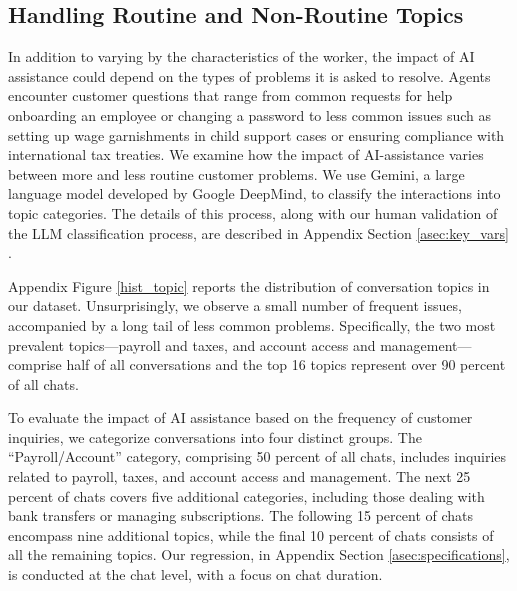 \documentclass[11pt]{article}
\begin{document}
\subsection{Handling Routine and Non-Routine Topics}

In addition to varying by the characteristics of the worker, the impact of AI assistance could depend on the types of problems it is asked to resolve.  Agents encounter customer questions that range from common requests for help onboarding an employee or changing a password to less common issues such as setting up wage garnishments in child support cases or ensuring compliance with international tax treaties. We examine how the impact of AI-assistance varies between more and less routine customer problems. We use Gemini, a large language model developed by Google DeepMind, to classify the interactions into topic categories. The details of this process, along with our human validation of the LLM classification process, are described in Appendix Section \ref{asec:key_vars} \citep{geminipaper}.


Appendix Figure \ref{hist_topic} reports the distribution of conversation topics in our dataset.  Unsurprisingly, we observe a small number of frequent issues, accompanied by a long tail of less common problems. Specifically, the two most prevalent topics---payroll and taxes, and account access and management---comprise half of all conversations and the top 16 topics represent over 90 percent of all chats.  

To evaluate the impact of AI assistance based on the frequency of customer inquiries, we categorize conversations into four distinct groups. The ``Payroll/Account'' category, comprising 50 percent of all chats, includes inquiries related to payroll, taxes, and account access and management. The next 25 percent of chats covers five additional categories, including those dealing with bank transfers or managing subscriptions.  The following 15 percent of chats encompass nine additional topics, while the final 10 percent of chats consists of all the remaining topics. Our regression, in Appendix Section \ref{asec:specifications}, is conducted at the chat level, with a focus on chat duration.
\end{document}
